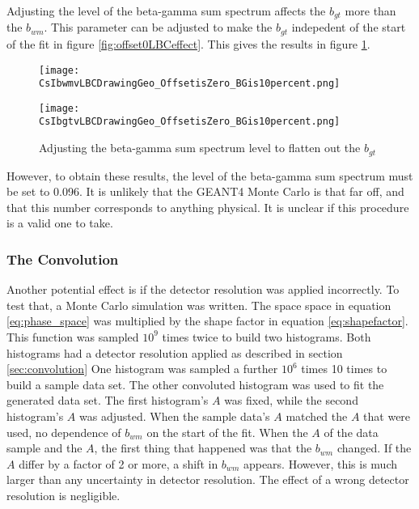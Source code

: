\documentclass[main.tex]{subfiles}
\begin{document}
Adjusting the level of the beta-gamma sum spectrum affects the $b_{gt}$ more than the $b_{wm}$.
This parameter can be adjusted to make the $b_{gt}$ indepedent of the start of the fit in figure \ref{fig:offset0LBCeffect}. 
This gives the results in figure \ref{fig:dataoffset0BG10per}. 

\begin{figure}
    \centering
    \begin{minipage}{0.50\textwidth}
        \centerline{\texttt{[image: CsIbwmvLBCDrawingGeo\_OffsetisZero\_BGis10percent.png]}}
    \end{minipage}\hfill
    \begin{minipage}{0.50\textwidth}
        \centerline{\texttt{[image: CsIbgtvLBCDrawingGeo\_OffsetisZero\_BGis10percent.png]}}
    \end{minipage}
    \caption{Adjusting the beta-gamma sum spectrum level to flatten out the $b_{gt}$}
    \label{fig:dataoffset0BG10per}
\end{figure}

However, to obtain these results, the level of the beta-gamma sum spectrum must be set to 0.096. 
It is unlikely that the GEANT4 Monte Carlo is that far off, and that this number corresponds to anything physical.
It is unclear if this procedure is a valid one to take.

\subsubsection{The Convolution}

Another potential effect is if the detector resolution was applied incorrectly.
To test that, a Monte Carlo simulation was written.
The space space in equation \ref{eq:phase_space} was multiplied by the shape factor in equation \ref{eq:shapefactor}.
This function was sampled $10^{9}$ times twice to build two histograms. 
Both histograms had a detector resolution applied as described in section \ref{sec:convolution}
One histogram was sampled a further $10^{6}$ times 10 times to build a sample data set.
The other convoluted histogram was used to fit the generated data set.
The first histogram's $A$ was fixed, while the second histogram's $A$ was adjusted.
When the sample data's $A$ matched the $A$ that were used, no dependence of $b_{wm}$ on the start of the fit.
When the $A$ of the data sample and the $A$, the first thing that happened was that the $b_{wm}$ changed.
If the $A$ differ by a factor of 2 or more, a shift in $b_{wm}$ appears.
However, this is much larger than any uncertainty in detector resolution.
The effect of a wrong detector resolution is negligible. 
\end{document}
